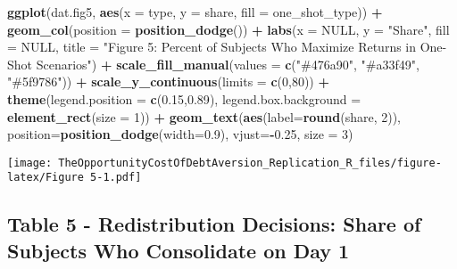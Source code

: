 \documentclass[
]{article}
\newenvironment{Shaded}{\begin{snugshade}}{\end{snugshade}}
\newcommand{\AttributeTok}[1]{\textcolor[rgb]{0.13,0.29,0.53}{#1}}
\newcommand{\ConstantTok}[1]{\textcolor[rgb]{0.56,0.35,0.01}{#1}}
\newcommand{\DecValTok}[1]{\textcolor[rgb]{0.00,0.00,0.81}{#1}}
\newcommand{\FloatTok}[1]{\textcolor[rgb]{0.00,0.00,0.81}{#1}}
\newcommand{\FunctionTok}[1]{\textcolor[rgb]{0.13,0.29,0.53}{\textbf{#1}}}
\newcommand{\NormalTok}[1]{#1}
\newcommand{\SpecialCharTok}[1]{\textcolor[rgb]{0.81,0.36,0.00}{\textbf{#1}}}
\newcommand{\StringTok}[1]{\textcolor[rgb]{0.31,0.60,0.02}{#1}}
\begin{document}
\begin{Shaded}
\begin{Highlighting}[]
\FunctionTok{ggplot}\NormalTok{(dat.fig5, }\FunctionTok{aes}\NormalTok{(}\AttributeTok{x =}\NormalTok{ type, }\AttributeTok{y =}\NormalTok{ share, }\AttributeTok{fill =}\NormalTok{ one\_shot\_type)) }\SpecialCharTok{+}
  \FunctionTok{geom\_col}\NormalTok{(}\AttributeTok{position =} \FunctionTok{position\_dodge}\NormalTok{()) }\SpecialCharTok{+}
  \FunctionTok{labs}\NormalTok{(}\AttributeTok{x =} \ConstantTok{NULL}\NormalTok{, }\AttributeTok{y =} \StringTok{"Share"}\NormalTok{, }\AttributeTok{fill =} \ConstantTok{NULL}\NormalTok{, }\AttributeTok{title =} \StringTok{"Figure 5: Percent of Subjects Who Maximize Returns in One{-}Shot Scenarios"}\NormalTok{) }\SpecialCharTok{+}
  \FunctionTok{scale\_fill\_manual}\NormalTok{(}\AttributeTok{values =} \FunctionTok{c}\NormalTok{(}\StringTok{"\#476a90"}\NormalTok{, }\StringTok{"\#a33f49"}\NormalTok{, }\StringTok{"\#5f9786"}\NormalTok{)) }\SpecialCharTok{+}
  \FunctionTok{scale\_y\_continuous}\NormalTok{(}\AttributeTok{limits =} \FunctionTok{c}\NormalTok{(}\DecValTok{0}\NormalTok{,}\DecValTok{80}\NormalTok{)) }\SpecialCharTok{+}
  \FunctionTok{theme}\NormalTok{(}\AttributeTok{legend.position =} \FunctionTok{c}\NormalTok{(}\FloatTok{0.15}\NormalTok{,}\FloatTok{0.89}\NormalTok{), }\AttributeTok{legend.box.background =} \FunctionTok{element\_rect}\NormalTok{(}\AttributeTok{size =} \DecValTok{1}\NormalTok{)) }\SpecialCharTok{+}
  \FunctionTok{geom\_text}\NormalTok{(}\FunctionTok{aes}\NormalTok{(}\AttributeTok{label=}\FunctionTok{round}\NormalTok{(share, }\DecValTok{2}\NormalTok{)), }\AttributeTok{position=}\FunctionTok{position\_dodge}\NormalTok{(}\AttributeTok{width=}\FloatTok{0.9}\NormalTok{), }\AttributeTok{vjust=}\SpecialCharTok{{-}}\FloatTok{0.25}\NormalTok{, }\AttributeTok{size =} \DecValTok{3}\NormalTok{)}
\end{Highlighting}
\end{Shaded}

\texttt{[image: TheOpportunityCostOfDebtAversion\_Replication\_R\_files/figure-latex/Figure 5-1.pdf]}

\subsection{Table 5 - Redistribution Decisions: Share of Subjects Who
Consolidate on Day
1}\label{table-5---redistribution-decisions-share-of-subjects-who-consolidate-on-day-1}
\end{document}
